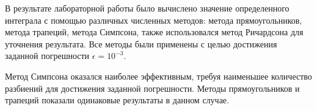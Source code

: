 В результате лабораторной работы было вычислено значение определенного интеграла с помощью различных численных методов: метода прямоугольников, метода трапеций, метода Симпсона, также использовался метод Ричардсона для уточнения результата. Все методы были применены с целью достижения заданной погрешности $\epsilon = 10^{-3}$.

Метод Симпсона оказался наиболее эффективным, требуя наименьшее количество разбиений для достижения заданной погрешности. Методы прямоугольников и трапеций показали одинаковые результаты в данном случае.